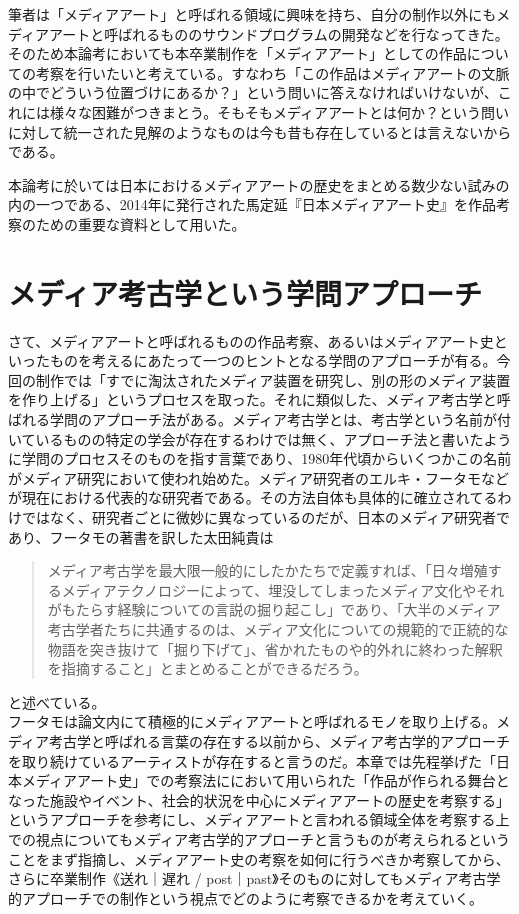 \documentclass[a4paper,report]{jsbook}
\begin{document}
筆者は「メディアアート」と呼ばれる領域に興味を持ち、自分の制作以外にもメディアアートと呼ばれるもののサウンドプログラムの開発などを行なってきた。\\
そのため本論考においても本卒業制作を「メディアアート」としての作品についての考察を行いたいと考えている。すなわち「この作品はメディアアートの文脈の中でどういう位置づけにあるか？」という問いに答えなければいけないが、これには様々な困難がつきまとう。そもそもメディアアートとは何か？という問いに対して統一された見解のようなものは今も昔も存在しているとは言えないからである。

本論考に於いては日本におけるメディアアートの歴史をまとめる数少ない試みの内の一つである、2014年に発行された馬定延『日本メディアアート史』を作品考察のための重要な資料として用いた。

\section{メディア考古学という学問アプローチ}\label{ux30e1ux30c7ux30a3ux30a2ux8003ux53e4ux5b66ux3068ux3044ux3046ux5b66ux554fux30a2ux30d7ux30edux30fcux30c1}

さて、メディアアートと呼ばれるものの作品考察、あるいはメディアアート史といったものを考えるにあたって一つのヒントとなる学問のアプローチが有る。今回の制作では「すでに淘汰されたメディア装置を研究し、別の形のメディア装置を作り上げる」というプロセスを取った。それに類似した、メディア考古学と呼ばれる学問のアプローチ法がある。メディア考古学とは、考古学という名前が付いているものの特定の学会が存在するわけでは無く、アプローチ法と書いたように学問のプロセスそのものを指す言葉であり、1980年代頃からいくつかこの名前がメディア研究において使われ始めた。メディア研究者のエルキ・フータモなどが現在における代表的な研究者である。その方法自体も具体的に確立されてるわけではなく、研究者ごとに微妙に異なっているのだが、日本のメディア研究者であり、フータモの著書を訳した太田純貴は

\begin{quote}
メディア考古学を最大限一般的にしたかたちで定義すれば、「日々増殖するメディアテクノロジーによって、埋没してしまったメディア文化やそれがもたらす経験についての言説の掘り起こし」であり、「大半のメディア考古学者たちに共通するのは、メディア文化についての規範的で正統的な物語を突き抜けて「掘り下げて」、省かれたものや的外れに終わった解釈を指摘すること」とまとめることができるだろう。
\end{quote}

と述べている\autocite{ohta:mediaarch}。\\
フータモは論文内にて積極的にメディアアートと呼ばれるモノを取り上げる\autocite{huhtamo:mediaarcheology}。メディア考古学と呼ばれる言葉の存在する以前から、メディア考古学的アプローチを取り続けているアーティストが存在すると言うのだ。本章では先程挙げた「日本メディアアート史」での考察法ににおいて用いられた「作品が作られる舞台となった施設やイベント、社会的状況を中心にメディアアートの歴史を考察する」というアプローチを参考にし、メディアアートと言われる領域全体を考察する上での視点についてもメディア考古学的アプローチと言うものが考えられるということをまず指摘し、メディアアート史の考察を如何に行うべきか考察してから、さらに卒業制作《送れ｜遅れ
/
post｜past》そのものに対してもメディア考古学的アプローチでの制作という視点でどのように考察できるかを考えていく。
\end{document}

